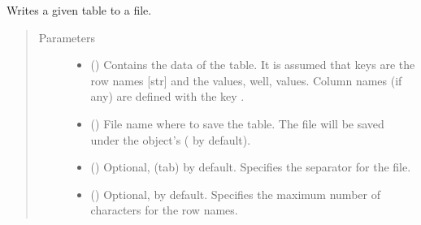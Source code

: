 \documentclass[letterpaper,10pt,english]{sphinxmanual}
\begin{document}
\begin{fulllineitems}
\begin{fulllineitems}
\begin{quote}
\begin{description}
\end{description}\end{quote}

\end{fulllineitems}


\begin{fulllineitems}
\label{\detokenize{main:pypath.main.PyPath.wang_effects}}
\end{fulllineitems}


\begin{fulllineitems}
\label{\detokenize{main:pypath.main.PyPath.write_table}}
Writes a given table to a file.
\begin{quote}\begin{description}
\item[{Parameters}] \leavevmode\begin{itemize}
\item {} 
 () \textendash{} Contains the data of the table. It is assumed that keys are
the row names {[}str{]} and the values, well, values. Column
names (if any) are defined with the key .

\item {} 
 () \textendash{} File name where to save the table. The file will be saved
under the object’s 
( by default).

\item {} 
 () \textendash{} Optional,  (tab) by default. Specifies the separator
for the file.

\item {} 
 () \textendash{} Optional,  by default. Specifies the maximum number
of characters for the row names.


\end{itemize}
\end{description}
\end{quote}
\end{fulllineitems}
\end{fulllineitems}
\end{document}
